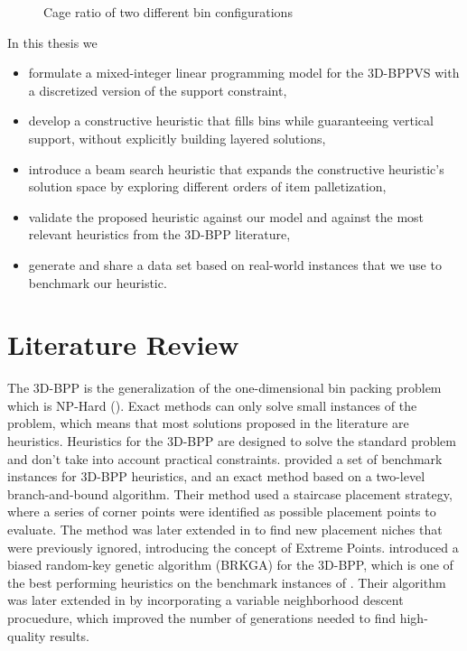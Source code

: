 \documentclass[11pt,a4paper,twocolumn]{article}
\begin{document}
\begin{figure}[h]
    \resizebox{\columnwidth}{!}{%
    
    }
    \caption{Cage ratio of two different bin configurations}
    \label{fig:cage_ratio}
\end{figure}

In this thesis we
\begin{itemize}
    \item formulate a mixed-integer linear programming model for the 3D-BPPVS with a discretized version of the support constraint,
    \item develop a constructive heuristic that fills bins while guaranteeing vertical support, without explicitly building layered solutions,
    \item introduce a beam search heuristic that expands the constructive heuristic's solution space by exploring different orders of item palletization,
    \item validate the proposed heuristic against our model and against the most relevant heuristics from the 3D-BPP literature,
    \item generate and share a data set based on real-world instances that we use to benchmark our heuristic.
\end{itemize}

\section{Literature Review}
The 3D-BPP is the generalization of the one-dimensional bin packing problem which is NP-Hard (\cite{martello2000three}).
Exact methods can only solve small instances of the problem, which means that most solutions proposed in the literature are heuristics.
Heuristics for the 3D-BPP are designed to solve the standard problem and don't take into account practical constraints.
\cite{martello2000three} provided a set of benchmark instances for 3D-BPP heuristics, and an exact method based on a two-level branch-and-bound algorithm.
Their method used a staircase placement strategy, where a series of corner points were identified as possible placement points to evaluate.
The method was later extended in \cite{crainic2008extreme} to find new placement niches that were previously ignored, introducing the concept of Extreme Points.
\cite{gonccalves2013biased} introduced a biased random-key genetic algorithm (BRKGA) for the 3D-BPP, which is one of the best performing heuristics on the benchmark instances of \cite{martello2000three}.
Their algorithm was later extended in \cite{zudio2018brkga} by incorporating a variable neighborhood descent procuedure, which improved the number of generations needed to find high-quality results.
\end{document}
